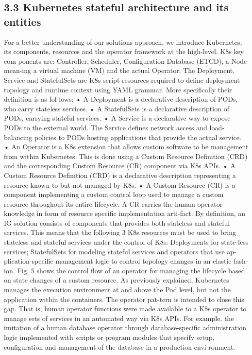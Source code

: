 \documentclass[runningheads]{llncs}
\begin{document}
\subsection{3.3	Kubernetes stateful architecture and its entities}
For a better understanding of our solutions approach, we introduce Kubernetes, its components, resources and the operator framework at the high-level. K8s key com-ponents are: Controller, Scheduler, Configuration Database (ETCD), a Node mean-ing a virtual machine (VM) and the actual Operator. The Deployment, Service and StatefulSets are K8s script resources required to define deployment topology and runtime context using YAML grammar. More specifically their definition is as fol-lows: 
•	A Deployment is a declarative description of PODs, who carry stateless services.
•	A StatefulSets  is a declarative description of PODs, carrying stateful services.
•	A Service is a declarative way to expose PODs to the external world. The Service defines network access and load-balancing policies to PODs hosting applications that provide the actual service. 
•	An Operator is a K8s extension that allows custom software to be management from within Kubernetes. This is done using a Custom Resource Definition (CRD) and the corresponding Custom Resource (CR) component via K8s APIs.
•	A Custom Resource Definition (CRD) is a declarative description representing a resource known to but not managed by K8s.
•	A Custom Resource (CR) is a component implementing a custom control loop used to manage a custom resource throughout its entire lifecycle. A CR carries the human operator knowledge in form of resource specific implementation arti-fact. 
By definition, an IG solution consists of components that provides both stateless and stateful services. This means that the following 3 K8s resources must be used to bring stateless and stateful services under the control of K8s: Deployments for state-less services; StatefulSets for modeling stateful services and operators that use ap-plication-specific management logic to control topology changes in an elastic fash-ion. Fig. 5 shows the control flow of an operator for managing the lifecycle based on state changes of a custom resource.
As previously explained, Kubernetes manages the execution environment at and above the Pod level, but not the application within the containers. The operator  pat-tern is intended to close this gap. That is, human operator functions were made available to a K8s operator to manage sets of services in an automated way via K8s APIs. For example, the imitation of a human database operator through database-specific administration logic implemented with scripts or program modules that specify setup, configuration and management of the database in a production envi-ronment.
\end{document}
